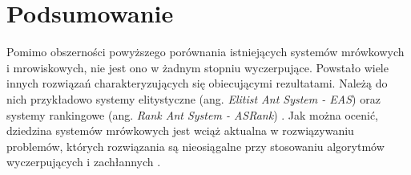 {    %
    \section{Podsumowanie}
    {
        Pomimo obszerności powyższego porównania istniejących systemów mrówkowych i mrowiskowych, nie jest ono w żadnym
        stopniu wyczerpujące. Powstało wiele innych rozwiązań charakteryzujących się obiecującymi rezultatami. Należą do
        nich przykładowo systemy elitystyczne (ang. \textit{Elitist Ant System - EAS}) \cite{Dorigo1996AntSO} oraz
        systemy rankingowe (ang. \textit{Rank Ant System - ASRank}) \cite{Bullnheimer1997ANR}. Jak można ocenić,
        dziedzina systemów mrówkowych jest wciąż aktualna w rozwiązywaniu problemów, których rozwiązania są nieosiągalne
        przy stosowaniu algorytmów wyczerpujących i zachłannych \cite{Dorigo2003TheAC}.
    }
}





